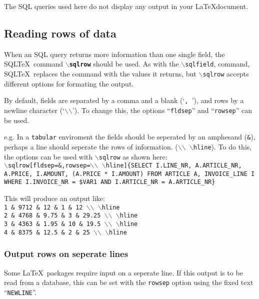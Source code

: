 \documentclass{article}
\newcommand{\bs}{\ensuremath{\backslash}}
\newcommand{\vs}{\vspace{3mm}}
\begin{document}
\vs

The SQL queries used here do not display any output in your \LaTeX document.


\subsection{Reading rows of data}\label{sqlrow}

When an SQL query returns more information than one single field, the SQL\TeX\
command \texttt{\textbf{\bs sqlrow}} should be used. As with the \texttt{\bs sqlfield},
command, SQL\TeX\ replaces the command with the values it returns, but \texttt{\bs sqlrow}
accepts different options for formating the output.

\vs

By default, fields are separated by a comma and a blank (`\texttt{,~}'), and rows by 
a newline character (`\texttt{\bs\bs}'). To change this, the options ``\texttt{fldsep}''
and ``\texttt{rowsep}'' can be used.

e.g. In a \texttt{tabular} enviroment the fields should be seperated by an amphesand (\texttt{\&}),
perhaps a line should seperate the rows of information. (\texttt{\bs\bs~\bs hline}).
To do this, the options can be used with \texttt{\bs sqlrow} as shown here: \\
\texttt{\bs sqlrow[fldsep=\&,rowsep=\bs\bs~\bs hline]\{SELECT I.LINE\_NR, A.ARTICLE\_NR, 
A.PRICE, I.AMOUNT, (A.PRICE * I.AMOUNT) FROM ARTICLE A, INVOICE\_LINE I WHERE I.INVOICE\_NR = \$VAR1 
AND I.ARTICLE\_NR = A.ARTICLE\_NR\}}

\vs

This will produce an output like: \\
\texttt{1 \& 9712 \& 12 \& 1 \& 12 \bs\bs~\bs hline \\
2 \& 4768 \& 9.75 \& 3 \& 29.25 \bs\bs~\bs hline \\
3 \& 4363 \& 1.95 \& 10 \& 19.5 \bs\bs~\bs hline \\
4 \& 8375 \& 12.5 \& 2 \& 25 \bs\bs~\bs hline}

\subsubsection{Output rows on seperate lines}

Some \LaTeX\ packages require input on a seperate line. If this output is to be
read from a database, this can be set with the \texttt{rowsep} option using the
fixed text ``\texttt{NEWLINE}''.
\end{document}
